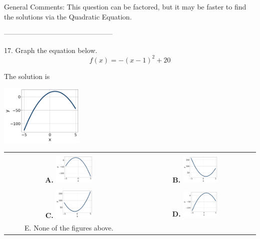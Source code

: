 \documentclass{extbook}[14pt]
\begin{document}
General Comments: This question can be factored, but it may be faster to find the solutions via the Quadratic Equation.

-----------------------------------------------

17. Graph the equation below.
\[ f(x) = -(x-1)^2 + 20 \] 

 
 The solution is  
 \begin{center} \includegraphics[width=0.3\textwidth]{../Figures/quadraticEquationToGraphDB.png} \end{center}\begin{tabular}{|c|c|} 
\hline 
 & \tabularnewline 
 \textbf{A.} \includegraphics[width=0.3\textwidth]{../Figures/quadraticEquationToGraphAB.png} & \textbf{B.} \includegraphics[width=0.3\textwidth]{../Figures/quadraticEquationToGraphBB.png} \tabularnewline 
\hline 
 & \tabularnewline 
 \textbf{C.} \includegraphics[width=0.3\textwidth]{../Figures/quadraticEquationToGraphCB.png} & \textbf{D.} \includegraphics[width=0.3\textwidth]{../Figures/quadraticEquationToGraphDB.png} \tabularnewline 
\hline 
 E. None of the figures above. & \tabularnewline 
\hline 
 \end{tabular} 
 
\end{document}
